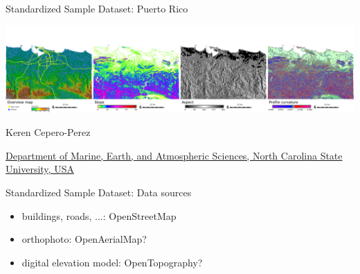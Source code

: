 \documentclass[xcolor={dvipsnames,usenames},beamer,aspectratio=169]{beamer}
\begin{document}
\begin{frame}{Standardized Sample Dataset: Puerto Rico}

\begin{center}
\includegraphics[width=\textwidth]{./images/dataset/std_dataset_pr_stripe.png}
\end{center}

Keren Cepero-Perez

{\scriptsize
\href{http://www.meas.ncsu.edu/}%
{Department of Marine, Earth, and Atmospheric Sciences,
North Carolina State University, USA}
}

\end{frame}



\begin{frame}{Standardized Sample Dataset: Data sources}

\begin{itemize}
 \item buildings, roads, ...: OpenStreetMap
 \item orthophoto: OpenAerialMap?
 \item digital elevation model: OpenTopography?
\end{itemize}

\end{frame}
\end{document}
